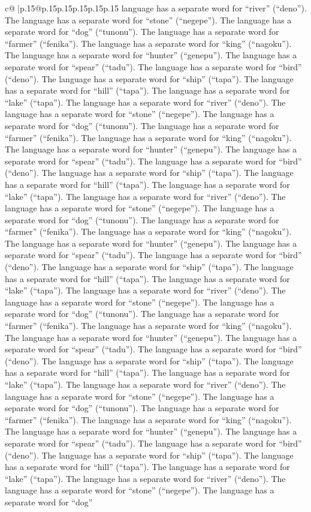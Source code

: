 \documentclass{article}
\begin{document}
{\begin{supertabular}{c@{$\;$}|p{.15\linewidth}@{}p{.15\linewidth}p{.15\linewidth}p{.15\linewidth}p{.15\linewidth}p{.15\linewidth}}
{{{language has a separate word for “river” (“deno”). The language has a separate word for “stone” (“negepe”). The language has a separate word for “dog” (“tunonu”). The language has a separate word for “farmer” (“fenika”). The language has a separate word for “king” (“nagoku”). The language has a separate word for “hunter” (“genepu”). The language has a separate word for “spear” (“tadu”). The language has a separate word for “bird” (“deno”). The language has a separate word for “ship” (“tapa”). The language has a separate word for “hill” (“tapa”). The language has a separate word for “lake” (“tapa”). The language has a separate word for “river” (“deno”). The language has a separate word for “stone” (“negepe”). The language has a separate word for “dog” (“tunonu”). The language has a separate word for “farmer” (“fenika”). The language has a separate word for “king” (“nagoku”). The language has a separate word for “hunter” (“genepu”). The language has a separate word for “spear” (“tadu”). The language has a separate word for “bird” (“deno”). The language has a separate word for “ship” (“tapa”). The language has a separate word for “hill” (“tapa”). The language has a separate word for “lake” (“tapa”). The language has a separate word for “river” (“deno”). The language has a separate word for “stone” (“negepe”). The language has a separate word for “dog” (“tunonu”). The language has a separate word for “farmer” (“fenika”). The language has a separate word for “king” (“nagoku”). The language has a separate word for “hunter” (“genepu”). The language has a separate word for “spear” (“tadu”). The language has a separate word for “bird” (“deno”). The language has a separate word for “ship” (“tapa”). The language has a separate word for “hill” (“tapa”). The language has a separate word for “lake” (“tapa”). The language has a separate word for “river” (“deno”). The language has a separate word for “stone” (“negepe”). The language has a separate word for “dog” (“tunonu”). The language has a separate word for “farmer” (“fenika”). The language has a separate word for “king” (“nagoku”). The language has a separate word for “hunter” (“genepu”). The language has a separate word for “spear” (“tadu”). The language has a separate word for “bird” (“deno”). The language has a separate word for “ship” (“tapa”). The language has a separate word for “hill” (“tapa”). The language has a separate word for “lake” (“tapa”). The language has a separate word for “river” (“deno”). The language has a separate word for “stone” (“negepe”). The language has a separate word for “dog” (“tunonu”). The language has a separate word for “farmer” (“fenika”). The language has a separate word for “king” (“nagoku”). The language has a separate word for “hunter” (“genepu”). The language has a separate word for “spear” (“tadu”). The language has a separate word for “bird” (“deno”). The language has a separate word for “ship” (“tapa”). The language has a separate word for “hill” (“tapa”). The language has a separate word for “lake” (“tapa”). The language has a separate word for “river” (“deno”). The language has a separate word for “stone” (“negepe”). The language has a separate word for “dog” }}}
\end{supertabular}}
\end{document}
